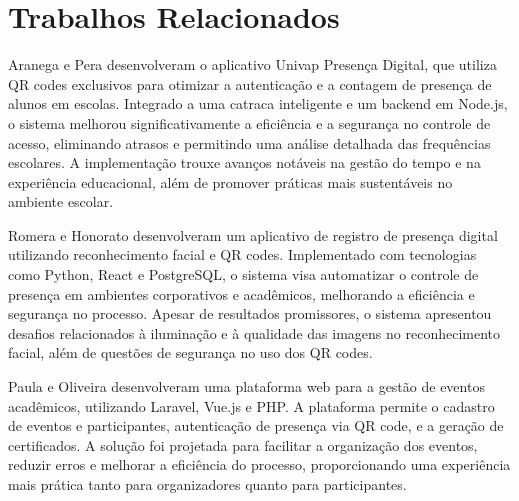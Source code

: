 \section{Trabalhos Relacionados}
\label{sec:trabalhos_relacionados}

Aranega e Pera \cite{aranega2023} desenvolveram o aplicativo Univap Presença Digital, que utiliza QR codes exclusivos para otimizar a autenticação e a contagem de presença de alunos em escolas. Integrado a uma catraca inteligente e um backend em Node.js, o sistema melhorou significativamente a eficiência e a segurança no controle de acesso, eliminando atrasos e permitindo uma análise detalhada das frequências escolares. A implementação trouxe avanços notáveis na gestão do tempo e na experiência educacional, além de promover práticas mais sustentáveis no ambiente escolar.

Romera e Honorato \cite{romera2023} desenvolveram um aplicativo de registro de presença digital utilizando reconhecimento facial e QR codes. Implementado com tecnologias como Python, React e PostgreSQL, o sistema visa automatizar o controle de presença em ambientes corporativos e acadêmicos, melhorando a eficiência e segurança no processo. Apesar de resultados promissores, o sistema apresentou desafios relacionados à iluminação e à qualidade das imagens no reconhecimento facial, além de questões de segurança no uso dos QR codes.

Paula e Oliveira \cite{paula2023} desenvolveram uma plataforma web para a gestão de eventos acadêmicos, utilizando Laravel, Vue.js e PHP. A plataforma permite o cadastro de eventos e participantes, autenticação de presença via QR code, e a geração de certificados. A solução foi projetada para facilitar a organização dos eventos, reduzir erros e melhorar a eficiência do processo, proporcionando uma experiência mais prática tanto para organizadores quanto para participantes.

